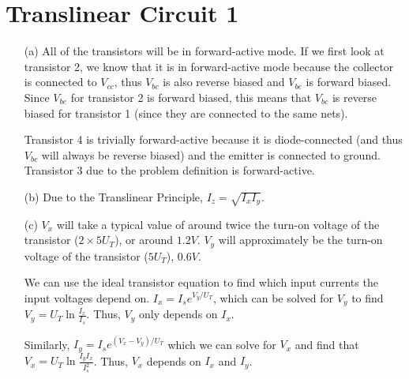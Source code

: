 \documentclass{article}
\begin{document}
\section{Translinear Circuit 1}
    \begin{itemize}
        \item [(a)]
           All of the transistors will be in forward-active mode. If we first look at transistor 2, we know that it is in forward-active mode because the collector is connected to $V_{cc}$, thus $V_{bc}$ is also reverse biased and $V_{be}$ is forward biased. Since $V_{be}$ for transistor 2 is forward biased, this means that $V_{bc}$ is reverse biased for transistor 1 (since they are connected to the same nets). 

            Transistor 4 is trivially forward-active because it is diode-connected (and thus $V_{bc}$ will always be reverse biased) and the emitter is connected to ground. Transistor 3 due to the problem definition is forward-active.

        \item [(b)]
            Due to the Translinear Principle, $I_z = \sqrt{I_xI_y}$.

        \item [(c)]
            $V_x$ will take a typical value of around twice the turn-on voltage of the transistor ($2 \times 5U_T$), or around $1.2V$. $V_y$ will approximately be the turn-on voltage of the transistor ($5U_T$), $0.6V$.

            We can use the ideal transistor equation to find which input currents the input voltages depend on. $I_x = I_se^{V_y/U_T}$, which can be solved for $V_y$ to find $V_y = U_T\ln\frac{I_x}{I_s}$. Thus, $V_y$ only depends on $I_x$.

            Similarly, $I_y = I_se^{(V_x - V_y)/U_T}$ which we can solve for $V_x$ and find that $V_x = U_T\ln\frac{I_yI_x}{I_s^2}$. Thus, $V_x$ depends on $I_x$ and $I_y$.

    \end{itemize}
\end{document}
